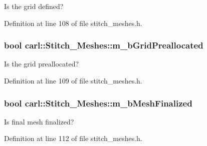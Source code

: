 Is the grid defined? 



Definition at line 108 of file stitch\+\_\+meshes.\+h.

\hypertarget{classcarl_1_1_stitch___meshes_aa21268c25f5ca61baeed4744b053e2b6}{}
\subsubsection[{m\+\_\+b\+Grid\+Preallocated}]{\setlength{\rightskip}{0pt plus 5cm}bool carl\+::\+Stitch\+\_\+\+Meshes\+::m\+\_\+b\+Grid\+Preallocated\hspace{0.3cm}{\ttfamily [protected]}}\label{classcarl_1_1_stitch___meshes_aa21268c25f5ca61baeed4744b053e2b6}


Is the grid preallocated? 



Definition at line 109 of file stitch\+\_\+meshes.\+h.

\hypertarget{classcarl_1_1_stitch___meshes_afbfd4f177dca665f8c50e9694b0f78cd}{}
\subsubsection[{m\+\_\+b\+Mesh\+Finalized}]{\setlength{\rightskip}{0pt plus 5cm}bool carl\+::\+Stitch\+\_\+\+Meshes\+::m\+\_\+b\+Mesh\+Finalized\hspace{0.3cm}{\ttfamily [protected]}}\label{classcarl_1_1_stitch___meshes_afbfd4f177dca665f8c50e9694b0f78cd}


Is final mesh finalized? 



Definition at line 112 of file stitch\+\_\+meshes.\+h.

\hypertarget{classcarl_1_1_stitch___meshes_aeb94b2d2b28624414fd00e02ec9a97e0}{}
